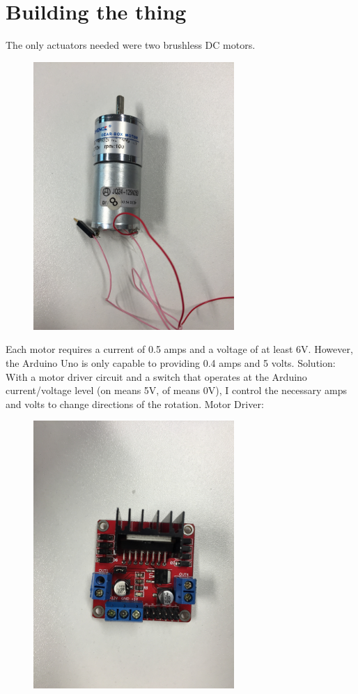 \documentclass[final,3p,times,twocolumn]{elsarticle}
\begin{document}
\section{Building the thing}
The only actuators needed were two brushless DC motors.
\begin{figure}[h!]
\includegraphics[trim={0cm 0cm 0cm 0cm}, clip, width=3in]{./media/motor.jpg}
\end{figure}
Each motor requires a current of 0.5 amps and a voltage of at least 6V.
However, the Arduino Uno is only capable to providing 0.4 amps and 5 volts.
Solution:
With a motor driver circuit and a switch that operates at the Arduino current/voltage level (on means 5V, of means 0V),  I control the necessary amps and volts to change directions of the rotation.
Motor Driver:
\begin{figure}[h!]
\includegraphics[trim={0cm 0cm 0cm 0cm}, clip, width=3in]{./media/motorDriver.jpg}
\end{figure}
\end{document}
